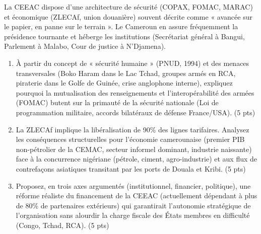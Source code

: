 \documentclass[11pt]{article}
\begin{document}
\begin{exercice}
La CEEAC dispose d'une architecture de sécurité (COPAX, FOMAC, MARAC) et économique (ZLECAf, union douanière) souvent décrite comme « avancée sur le papier, en panne sur le terrain ». Le Cameroun en assure fréquemment la présidence tournante et héberge les institutions (Secrétariat général à Bangui, Parlement à Malabo, Cour de justice à N'Djamena).
\begin{enumerate}
    \item À partir du concept de « sécurité humaine » (PNUD, 1994) et des menaces transversales (Boko Haram dans le Lac Tchad, groupes armés en RCA, piraterie dans le Golfe de Guinée, crise anglophone interne), expliquez pourquoi la mutualisation des renseignements et l'interopérabilité des armées (FOMAC) butent sur la primauté de la sécurité nationale (Loi de programmation militaire, accords bilatéraux de défense France/USA). (5 pts)
    \item La ZLECAf implique la libéralisation de 90\% des lignes tarifaires. Analysez les conséquences structurelles pour l'économie camerounaise (premier PIB non-pétrolier de la CEMAC, secteur informel dominant, industrie naissante) face à la concurrence nigériane (pétrole, ciment, agro-industrie) et aux flux de contrefaçons asiatiques transitant par les ports de Douala et Kribi. (5 pts)
    \item Proposez, en trois axes argumentés (institutionnel, financier, politique), une réforme réaliste du financement de la CEEAC (actuellement dépendant à plus de 80\% de partenaires extérieurs) qui garantirait l'autonomie stratégique de l'organisation sans alourdir la charge fiscale des États membres en difficulté (Congo, Tchad, RCA). (5 pts)
\end{enumerate}
\end{exercice}
\end{document}
